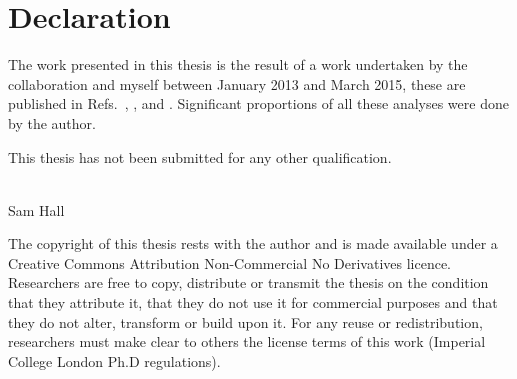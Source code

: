 \clearpage
\chapter*{\centering Declaration}

\begin{center}
  \begin{minipage}{0.8\textwidth}
    The work presented in this thesis is the result of a work undertaken by the
    \lhcb collaboration and myself between January 2013 and March 2015, these are
    published in Refs.~\cite{Aaij:2012zh}, \cite{Aaij:2014kwa}, and \cite{DB}.
    Significant proportions of all these analyses were done by the author.

    This thesis has not been submitted for any other qualification.
    \\\\
    \begin{flushright}
      Sam Hall\\
      \shortdate
    \end{flushright}
  \end{minipage}

    \vfill

  \begin{minipage}{0.8\textwidth}
    \footnotesize
    The copyright of this thesis rests with the author and is made available under a Creative
    Commons Attribution Non-Commercial No Derivatives licence. Researchers are free to copy,
    distribute or transmit the thesis on the condition that they attribute it, that they do not use
    it for commercial purposes and that they do not alter, transform or build upon it. For any
    reuse or redistribution, researchers must make clear to others the license terms of this work
    (Imperial College London Ph.D regulations).
  \end{minipage}
  \vspace{0.5cm}
\end{center}
